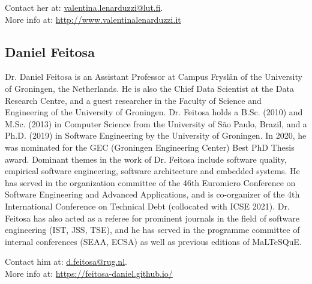 \smallskip
\noindent 
Contact her at: \href{mailto:valentina.lenarduzzi@lut.fi}{valentina.lenarduzzi@lut.fi}.\\
More info at: \url{http://www.valentinalenarduzzi.it}

\subsection{Daniel Feitosa}
Dr. Daniel Feitosa is an Assistant Professor at Campus Fryslân of the University of Groningen, the Netherlands. He is also the Chief Data Scientist at the Data Research Centre, and a guest researcher in the Faculty of Science and Engineering of the University of Groningen. 
Dr. Feitosa holds a B.Sc. (2010) and M.Sc. (2013) in Computer Science from the University of São Paulo, Brazil, and a Ph.D. (2019) in Software Engineering by the University of Groningen. In 2020, he was nominated for the GEC (Groningen Engineering Center) Best PhD Thesis award. Dominant themes in the work of Dr. Feitosa include software quality, empirical software engineering, software architecture and embedded systems.
He has served in the organization committee of the 46th Euromicro Conference on Software Engineering and Advanced Applications, and is co-organizer of the 4th International Conference on Technical Debt (collocated with ICSE 2021). Dr. Feitosa has also acted as a referee for prominent journals in the field of software engineering (IST, JSS, TSE), and he has served in the programme committee of internal conferences (SEAA, ECSA) as well as previous editions of MaLTeSQuE.

\smallskip
\noindent Contact him at: \href{mailto:d.feitosa@rug.nl}{d.feitosa@rug.nl}.\\
More info at: \url{https://feitosa-daniel.github.io/}\\

